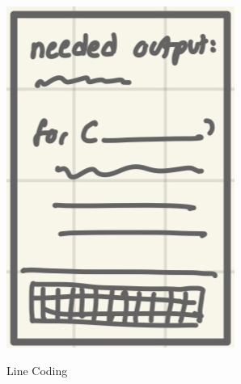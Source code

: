 \begin{figure}[!htbp]
\begin{subfigure}[b]{0.2\linewidth}
			\includegraphics[width=\textwidth]{Ex2.png}\\
			\caption{Line Coding}
		\end{subfigure}
		\hspace{1em}
		\begin{subfigure}[b]{0.2\linewidth}

\end{subfigure}
\end{figure}
